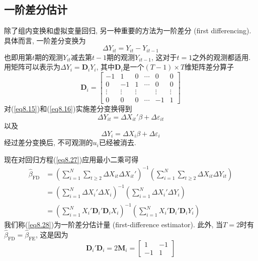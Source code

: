\documentclass[cn, 12pt, math=mtpro2, bibstyle=apa, blue, twocol]{elegantbook}
\newcommand{\hb}{\hat{\beta}}
\begin{document}
\subsection{一阶差分估计}
除了组内变换和虚拟变量回归, 另一种重要的方法为一阶差分 (first differencing). 具体而言, 一阶差分变换为
$$\Delta Y_{it}=Y_{it}-Y_{it-1}$$
也即用第$t$期的观测$Y_{it}$减去第$t-1$期的观测$Y_{it-1}$, 这对于$t=1$之外的观测都适用. 用矩阵可以表示为$\Delta Y_i=\mathbold{D}_iY_i$, 其中$\mathbold{D}_i$是一个$(T-1)\times T$维矩阵差分算子
$$\mathbold{D}_i=\begin{bmatrix}
                   -1 & 1 & 0 & \cdots & 0 & 0 \\
                   0 & -1 & 1 & \cdots & 0 & 0 \\
                   \vdots & \vdots & \vdots &  & \vdots & \vdots \\
                   0 & 0 & 0 & \cdots & -1 & 1
                 \end{bmatrix}$$
对(\ref{eq8.15})和(\ref{eq8.16})实施差分变换得到
$$\Delta Y_{it}=\Delta X_{it}'\beta+\Delta \varepsilon_{it}$$
以及
\begin{equation}\label{eq8.27}
  \Delta Y_i=\Delta X_i\beta+\Delta \varepsilon_i
\end{equation}
经过差分变换后, 不可观测的$u_i$已经被消去.

现在对回归方程(\ref{eq8.27})应用最小二乘可得
\begin{align}
\hb_{\text{FD}}&=\left(\sum_{i=1}^{N}\sum_{t\geq2}\Delta X_{it}\Delta X_{it}'\right)^{-1}\left(\sum_{i=1}^{N}\sum_{t\geq2}\Delta X_{it}\Delta Y_{it}\right) \nonumber \\
&=\left(\sum_{i=1}^{N}\Delta X_i'\Delta X_i\right)^{-1}\left(\sum_{i=1}^{N}\Delta X_i'\Delta Y_i\right) \nonumber \\
&=\left(\sum_{i=1}^{N}X_i'\mathbold{D}_i'\mathbold{D}_iX_i\right)^{-1}\left(\sum_{i=1}^{N}X_i'\mathbold{D}_i'\mathbold{D}_iY_i\right) \label{eq8.28}
\end{align}
我们称(\ref{eq8.28})为一阶差分估计量 (first-difference estimator). 此外, 当$T=2$时有$\hb_{\text{FD}}=\hb_{\text{FE}}$, 这是因为
$$\mathbold{D}_i'\mathbold{D}_i=2\mathbold{M}_i=\begin{bmatrix}
                                                  1 & -1 \\
                                                  -1 & 1
                                                \end{bmatrix}$$
\end{document}
